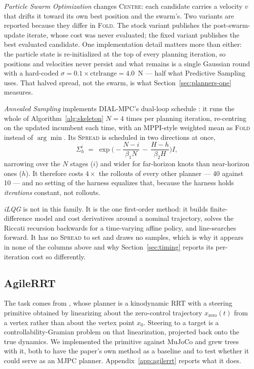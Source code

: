 \documentclass[conference]{IEEEtran}
\begin{document}
\emph{Particle Swarm Optimization} \cite{pso} changes \textsc{Centre}: each
candidate carries a velocity $v$ that drifts it toward its own best position and
the swarm's. Two variants are reported because they differ in \textsc{Fold}. The
stock variant publishes the post-swarm-update iterate, whose cost was never
evaluated; the fixed variant publishes the best evaluated candidate. One
implementation detail matters more than either: the particle state is
re-initialized at the top of every planning iteration, so positions and
velocities never persist and what remains is a single Gaussian round with a
hard-coded $\sigma = 0.1 \times \mathrm{ctrlrange} = 4.0$~N --- half what
Predictive Sampling uses. That halved spread, not the swarm, is what
Section~\ref{sec:planners-one} measures.

\emph{Annealed Sampling} implements DIAL-MPC's dual-loop schedule \cite{dial}:
it runs the whole of Algorithm~\ref{alg:skeleton} $N = 4$ times per planning
iteration, re-centring on the updated incumbent each time, with an MPPI-style
weighted mean \cite{mppi} as \textsc{Fold} instead of $\arg\min$. Its
\textsc{Spread} is scheduled in two directions at once,
\begin{equation}
\Sigma^{i}_{h} \;=\; \exp\!\Big(\!-\frac{N-i}{\beta_1 N}
                                \,-\, \frac{H-h}{\beta_2 H}\Big) I,
\label{eq:anneal}
\end{equation}
narrowing over the $N$ stages ($i$) and wider for far-horizon knots than
near-horizon ones ($h$). It therefore costs $4\times$ the rollouts of every
other planner --- 40 against 10 --- and no setting of the harness equalizes
that, because the harness holds \emph{iterations} constant, not rollouts.

\emph{iLQG} \cite{ilqg} is not in this family. It is the one first-order method:
it builds finite-difference model and cost derivatives around a nominal
trajectory, solves the Riccati recursion backwards for a time-varying affine
policy, and line-searches forward. It has no \textsc{Spread} to set and draws no
samples, which is why it appears in none of the columns above and why
Section~\ref{sec:timing} reports its per-iteration cost so differently.

\subsection{AgileRRT}
\label{sec:agilerrt-method}

The task comes from \cite{caldwell2015}, whose planner is a kinodynamic RRT
\cite{lavalle2001} with a steering primitive obtained by linearizing about the
zero-control trajectory $x_{\text{zero}}(t)$ from a vertex rather than about the
vertex point $x_0$. Steering to a target is a controllability-Gramian problem on
that linearization, projected back onto the true dynamics. We implemented the
primitive against MuJoCo and grew trees with it, both to have the paper's own
method as a baseline and to test whether it could serve as an MJPC planner.
Appendix~\ref{app:agilerrt} reports what it does.
\end{document}
